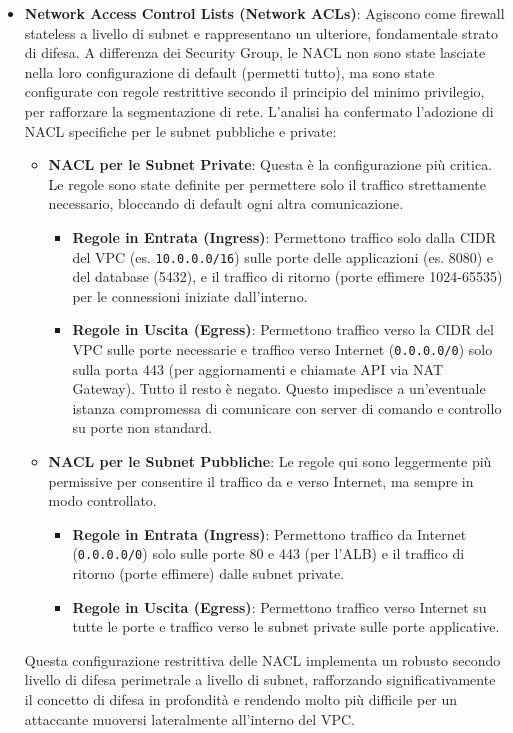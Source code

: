 \begin{itemize}
\item \textbf{Network Access Control Lists (Network ACLs)}: Agiscono come firewall stateless a livello di subnet e rappresentano un ulteriore, fondamentale strato di difesa. A differenza dei Security Group, le NACL non sono state lasciate nella loro configurazione di default (permetti tutto), ma sono state configurate con regole restrittive secondo il principio del minimo privilegio, per rafforzare la segmentazione di rete.
L'analisi ha confermato l'adozione di NACL specifiche per le subnet pubbliche e private:
\begin{itemize}
\item \textbf{NACL per le Subnet Private}: Questa è la configurazione più critica. Le regole sono state definite per permettere solo il traffico strettamente necessario, bloccando di default ogni altra comunicazione.
\begin{itemize}
\item \textbf{Regole in Entrata (Ingress)}: Permettono traffico solo dalla CIDR del VPC (es. \texttt{10.0.0.0/16}) sulle porte delle applicazioni (es. 8080) e del database (5432), e il traffico di ritorno (porte effimere 1024-65535) per le connessioni iniziate dall'interno.
\item \textbf{Regole in Uscita (Egress)}: Permettono traffico verso la CIDR del VPC sulle porte necessarie e traffico verso Internet (\texttt{0.0.0.0/0}) solo sulla porta 443 (per aggiornamenti e chiamate API via NAT Gateway). Tutto il resto è negato. Questo impedisce a un'eventuale istanza compromessa di comunicare con server di comando e controllo su porte non standard.
\end{itemize}
\item \textbf{NACL per le Subnet Pubbliche}: Le regole qui sono leggermente più permissive per consentire il traffico da e verso Internet, ma sempre in modo controllato.
\begin{itemize}
\item \textbf{Regole in Entrata (Ingress)}: Permettono traffico da Internet (\texttt{0.0.0.0/0}) solo sulle porte 80 e 443 (per l'ALB) e il traffico di ritorno (porte effimere) dalle subnet private.
\item \textbf{Regole in Uscita (Egress)}: Permettono traffico verso Internet su tutte le porte e traffico verso le subnet private sulle porte applicative.
\end{itemize}
\end{itemize}
Questa configurazione restrittiva delle NACL implementa un robusto secondo livello di difesa perimetrale a livello di subnet, rafforzando significativamente il concetto di difesa in profondità e rendendo molto più difficile per un attaccante muoversi lateralmente all'interno del VPC.
\end{itemize}

